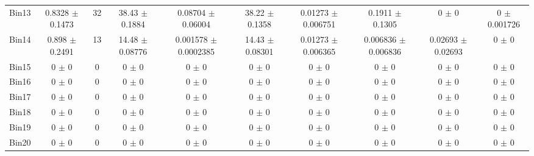 \begin{tabular}{@{\extracolsep{4pt}}lccccccccc@{}}
     Bin13 & 0.8328 $\pm$ 0.1473 & 32 & 38.43 $\pm$ 0.1884 & 0.08704 $\pm$ 0.06004 & 38.22 $\pm$ 0.1358 & 0.01273 $\pm$ 0.006751 & 0.1911 $\pm$ 0.1305 & 0 $\pm$ 0 & 0 $\pm$ 0.001726 \\ 
     Bin14 & 0.898 $\pm$ 0.2491 & 13 & 14.48 $\pm$ 0.08776 & 0.001578 $\pm$ 0.0002385 & 14.43 $\pm$ 0.08301 & 0.01273 $\pm$ 0.006365 & 0.006836 $\pm$ 0.006836 & 0.02693 $\pm$ 0.02693 & 0 $\pm$ 0 \\ 
     Bin15 & 0 $\pm$ 0 & 0 & 0 $\pm$ 0 & 0 $\pm$ 0 & 0 $\pm$ 0 & 0 $\pm$ 0 & 0 $\pm$ 0 & 0 $\pm$ 0 & 0 $\pm$ 0 \\ 
     Bin16 & 0 $\pm$ 0 & 0 & 0 $\pm$ 0 & 0 $\pm$ 0 & 0 $\pm$ 0 & 0 $\pm$ 0 & 0 $\pm$ 0 & 0 $\pm$ 0 & 0 $\pm$ 0 \\ 
     Bin17 & 0 $\pm$ 0 & 0 & 0 $\pm$ 0 & 0 $\pm$ 0 & 0 $\pm$ 0 & 0 $\pm$ 0 & 0 $\pm$ 0 & 0 $\pm$ 0 & 0 $\pm$ 0 \\ 
     Bin18 & 0 $\pm$ 0 & 0 & 0 $\pm$ 0 & 0 $\pm$ 0 & 0 $\pm$ 0 & 0 $\pm$ 0 & 0 $\pm$ 0 & 0 $\pm$ 0 & 0 $\pm$ 0 \\ 
     Bin19 & 0 $\pm$ 0 & 0 & 0 $\pm$ 0 & 0 $\pm$ 0 & 0 $\pm$ 0 & 0 $\pm$ 0 & 0 $\pm$ 0 & 0 $\pm$ 0 & 0 $\pm$ 0 \\ 
     Bin20 & 0 $\pm$ 0 & 0 & 0 $\pm$ 0 & 0 $\pm$ 0 & 0 $\pm$ 0 & 0 $\pm$ 0 & 0 $\pm$ 0 & 0 $\pm$ 0 & 0 $\pm$ 0 \\ 
\hline\hline
  \end{tabular}
